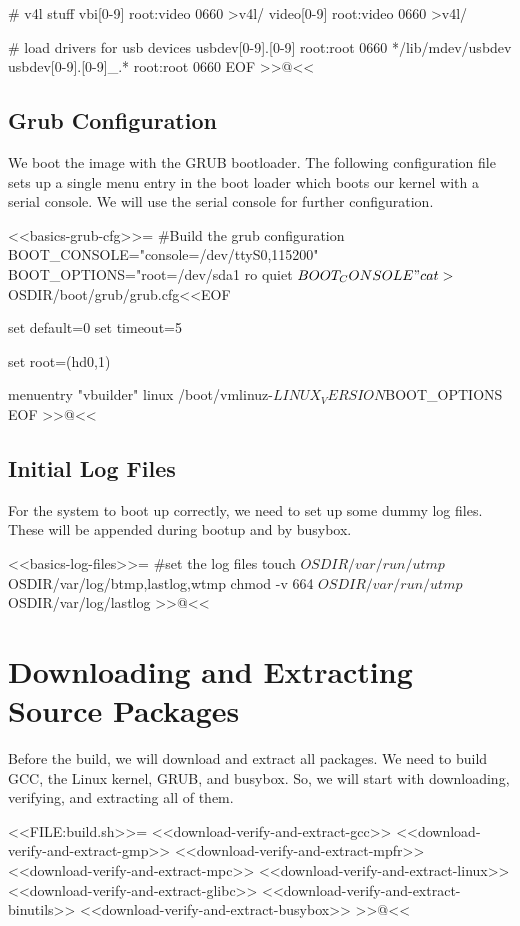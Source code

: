 # v4l stuff
vbi[0-9]        root:video 0660 >v4l/
video[0-9]      root:video 0660 >v4l/

# load drivers for usb devices
usbdev[0-9].[0-9]       root:root 0660 */lib/mdev/usbdev
usbdev[0-9].[0-9]_.*    root:root 0660
EOF
>>@<<

\subsection{Grub Configuration}

We boot the image with the GRUB bootloader. The following configuration file
sets up a single menu entry in the boot loader which boots our kernel with a
serial console.  We will use the serial console for further configuration.

<<basics-grub-cfg>>=
#Build the grub configuration
BOOT_CONSOLE="console=/dev/ttyS0,115200"
BOOT_OPTIONS="root=/dev/sda1 ro quiet $BOOT_CONSOLE"
cat > ${OSDIR}/boot/grub/grub.cfg<<EOF

set default=0
set timeout=5

set root=(hd0,1)

menuentry "vbuilder" {
        linux   /boot/vmlinuz-${LINUX_VERSION} ${BOOT_OPTIONS}
}
EOF
>>@<<

\subsection{Initial Log Files}

For the system to boot up correctly, we need to set up some dummy log files.
These will be appended during bootup and by busybox.

<<basics-log-files>>=
#set the log files
touch ${OSDIR}/var/run/utmp ${OSDIR}/var/log/{btmp,lastlog,wtmp}
chmod -v 664 ${OSDIR}/var/run/utmp ${OSDIR}/var/log/lastlog
>>@<<

\section{Downloading and Extracting Source Packages}

Before the build, we will download and extract all packages.  We need to build
GCC, the Linux kernel, GRUB, and busybox.  So, we will start with downloading,
verifying, and extracting all of them.

<<FILE:build.sh>>=
    <<download-verify-and-extract-gcc>>
    <<download-verify-and-extract-gmp>>
    <<download-verify-and-extract-mpfr>>
    <<download-verify-and-extract-mpc>>
    <<download-verify-and-extract-linux>>
    <<download-verify-and-extract-glibc>>
    <<download-verify-and-extract-binutils>>
    <<download-verify-and-extract-busybox>>
>>@<<

